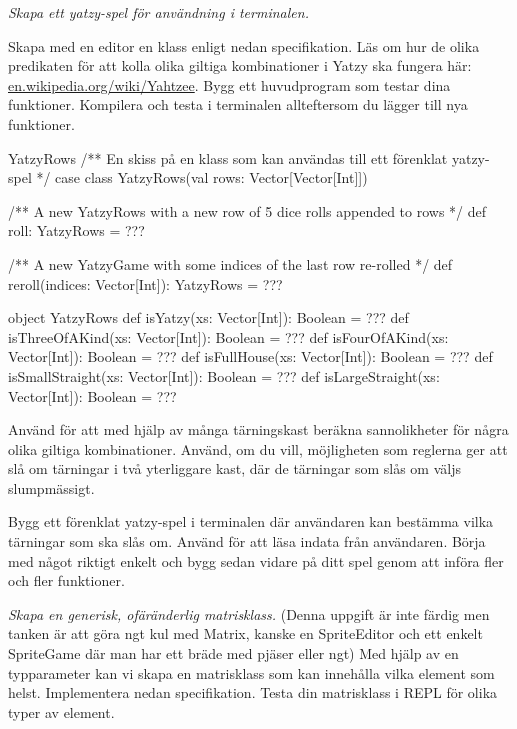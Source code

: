 \ExtraTasks %

\Task \emph{Skapa ett yatzy-spel för användning i terminalen.}

\Subtask Skapa med en editor en klass enligt nedan specifikation. Läs om hur de olika predikaten för att kolla olika giltiga kombinationer i Yatzy ska fungera här: \href{https://en.wikipedia.org/wiki/Yahtzee}{en.wikipedia.org/wiki/Yahtzee}. Bygg ett huvudprogram som testar dina funktioner. Kompilera och testa i terminalen allteftersom du lägger till nya funktioner.

\begin{ScalaSpec}{YatzyRows}
/** En skiss på en klass som kan användas till ett förenklat yatzy-spel */
case class YatzyRows(val rows: Vector[Vector[Int]]) {
  /** A new YatzyRows with a new row of 5 dice rolls appended to rows  */
  def roll: YatzyRows = ???

  /** A new YatzyGame with some indices of the last row re-rolled  */
  def reroll(indices: Vector[Int]): YatzyRows = ???
}

object YatzyRows {
  def isYatzy(xs: Vector[Int]): Boolean = ???
  def isThreeOfAKind(xs: Vector[Int]): Boolean = ???
  def isFourOfAKind(xs: Vector[Int]): Boolean = ???
  def isFullHouse(xs: Vector[Int]): Boolean = ???
  def isSmallStraight(xs: Vector[Int]): Boolean = ???
  def isLargeStraight(xs: Vector[Int]): Boolean = ???
}
\end{ScalaSpec}


\Subtask Använd  för att med hjälp av många tärningskast beräkna sannolikheter för några olika giltiga kombinationer. Använd, om du vill, möjligheten som reglerna ger att slå om tärningar i två yterliggare kast, där de tärningar som slås om väljs slumpmässigt.

\Subtask Bygg ett förenklat yatzy-spel i terminalen där användaren kan bestämma vilka tärningar som ska slås om. Använd  för att läsa indata från användaren. Börja med något riktigt enkelt och bygg sedan vidare på ditt spel genom att införa fler och fler funktioner.



\AdvancedTasks %

\TODO

\Task \label{task:generic-matrix} \emph{Skapa en generisk, ofäränderlig matrisklass.} (\TODO  Denna uppgift är inte färdig men tanken är att göra ngt kul med Matrix, kanske en SpriteEditor och ett enkelt SpriteGame där man har ett bräde med pjäser eller ngt) Med hjälp av en typparameter kan vi skapa en matrisklass som kan innehålla vilka element som helst. Implementera nedan specifikation. Testa din matrisklass i REPL för olika typer av element.

